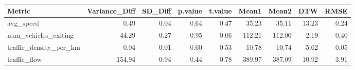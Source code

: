 \begin{table}[ht]
\centering
\begin{tabular}{lrrrrrrrr}
  \hline
Metric & Variance\_Diff & SD\_Diff & p.value & t.value & Mean1 & Mean2 & DTW & RMSE \\ 
  \hline
avg\_speed & 0.49 & 0.04 & 0.64 & 0.47 & 35.23 & 35.11 & 13.23 & 0.24 \\ 
  num\_vehicles\_exiting & 44.29 & 0.27 & 0.95 & 0.06 & 112.21 & 112.00 & 2.19 & 0.40 \\ 
  traffic\_density\_per\_km & 0.04 & 0.01 & 0.60 & 0.53 & 10.78 & 10.74 & 5.62 & 0.05 \\ 
  traffic\_flow & 154.94 & 0.94 & 0.44 & 0.78 & 389.97 & 387.09 & 10.92 & 3.91 \\ 
   \hline
\end{tabular}
\end{table}
